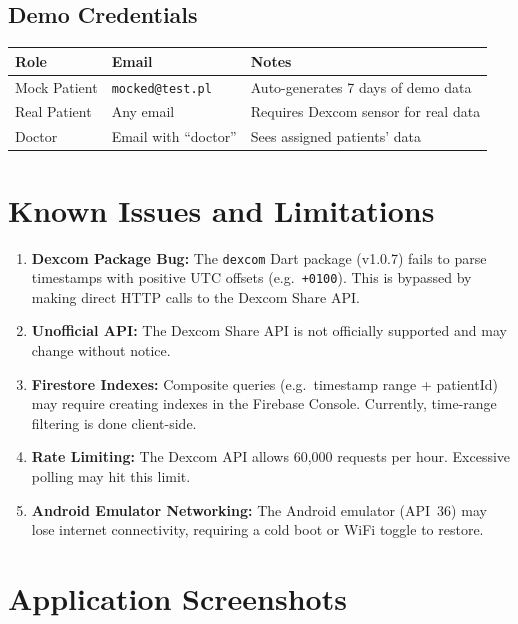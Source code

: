 \documentclass[12pt,a4paper]{article}
\begin{document}
\subsection{Demo Credentials}

\begin{longtable}{p{4cm} p{5cm} p{5cm}}
\toprule
\textbf{Role} & \textbf{Email} & \textbf{Notes} \\
\midrule
Mock Patient & \texttt{mocked@test.pl} & Auto-generates 7 days of demo data \\
Real Patient & Any email & Requires Dexcom sensor for real data \\
Doctor & Email with ``doctor'' & Sees assigned patients' data \\
\bottomrule
\end{longtable}

\section{Known Issues and Limitations}

\begin{enumerate}
    \item \textbf{Dexcom Package Bug:} The \texttt{dexcom} Dart package (v1.0.7) fails to parse timestamps with positive UTC offsets (e.g.\ \texttt{+0100}). This is bypassed by making direct HTTP calls to the Dexcom Share API.
    \item \textbf{Unofficial API:} The Dexcom Share API is not officially supported and may change without notice.
    \item \textbf{Firestore Indexes:} Composite queries (e.g.\ timestamp range + patientId) may require creating indexes in the Firebase Console. Currently, time-range filtering is done client-side.
    \item \textbf{Rate Limiting:} The Dexcom API allows 60,000 requests per hour. Excessive polling may hit this limit.
    \item \textbf{Android Emulator Networking:} The Android emulator (API~36) may lose internet connectivity, requiring a cold boot or WiFi toggle to restore.
\end{enumerate}

\section{Application Screenshots}
\end{document}
